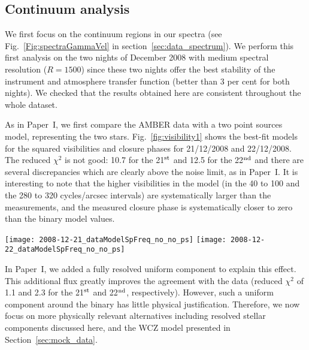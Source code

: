 \documentclass[usenatbib]{mnras}%
\begin{document}
\subsection{Continuum analysis}\label{sec:data_continuum}

We  first focus on the continuum regions in our spectra (see Fig.~\ref{Fig:spectraGammaVel} in section~\ref{sec:data_spectrum}). We perform this first analysis on the two nights of December 2008 with medium spectral resolution ($R=1500$) since these two nights offer the best stability of the instrument  and atmosphere transfer function (better than 3 per cent for both nights). We checked that the results obtained here are consistent throughout the whole dataset.
 
As in Paper~I, we first compare  the AMBER data with a two point sources model, representing the two stars. Fig.~\ref{fig:visibility1} shows the best-fit models for the squared visibilities and closure phases for 21/12/2008 and 22/12/2008. The reduced $\chi^2$ is not good: 10.7 for the 21$^{\rm st}$ and 12.5 for the 22$^{\rm nd}$ and there are several discrepancies which are clearly above the noise limit, as in Paper~I. It is interesting to note that the higher visibilities in the model (in the 40 to 100 and the 280 to 320 cycles/arcsec intervals) are systematically larger than the measurements, and the measured closure phase is systematically closer to zero than the binary model values.

 \begin{figure*}
   \centering
  \texttt{[image: 2008-12-21\_dataModelSpFreq\_no\_no\_ps]}
  \texttt{[image: 2008-12-22\_dataModelSpFreq\_no\_no\_ps]}
  \caption{Continuum visibilities (top plots) and closure phases (bottom plots), together with residuals (smaller plots), from our high-fidelity observing campaign from 2008, projected along the binary star direction (to ease the reading of the binary star modulation). Left: 21/12/2008,  right: 22/12/2008. The dashed lines representing the 2 point sources geometrical model are too high in visibility and too far from zero in closure phase when compared with the measurements, showing that a "two point sources" model cannot perfectly fit the data. The colors show the wavelength dependence.}
  \label{fig:visibility1}
 \end{figure*}
 
In Paper~I, we added a fully resolved uniform component to explain this effect. This additional flux greatly improves the agreement with the data (reduced $\chi^2$ of 1.1 and 2.3 for the 21$^{\rm st}$ and 22$^{\rm nd}$, respectively). However, such a uniform component around the binary has little physical justification. Therefore, we now focus on more physically relevant alternatives including resolved stellar components discussed here, and the WCZ model presented in Section~\ref{sec:mock_data}. 
\end{document}
